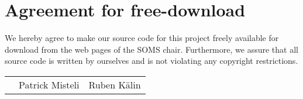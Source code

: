 \documentclass[11pt]{article}
\begin{document}

\newpage


\newpage
\section*{Agreement for free-download}
\bigskip


\bigskip


\large We hereby agree to make our source code for this project freely available for download from the web pages of the SOMS chair. Furthermore, we assure that all source code is written by ourselves and is not violating any copyright restrictions.

\begin{center}

\bigskip


\bigskip


\begin{tabular}{@{}p{3.3cm}@{}p{6cm}@{}@{}p{6cm}@{}}
\begin{minipage}{3cm}

\end{minipage}
&
\begin{minipage}{6cm}
\vspace{2mm} \large Patrick Misteli

 \vspace{\baselineskip}

\end{minipage}
&
\begin{minipage}{6cm}

\large Ruben K{\"a}lin

\end{minipage}
\end{tabular}


\end{center}
\newpage







\tableofcontents

\newpage

\end{document}
